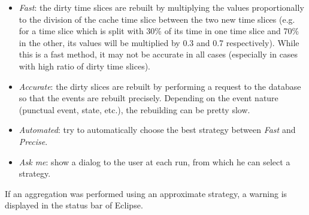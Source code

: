 \documentclass[twoside]{article}
\begin{document}
\begin{sloppypar}
\begin{itemize}
	\begin{itemize}
		\item \textit{Fast}: the dirty time slices are rebuilt by multiplying the values proportionally to the division of the cache time slice between the two new time slices (e.g. for a time slice which is split with 30\% of its time in one time slice and 70\% in the other, its values will be multiplied by 0.3 and 0.7 respectively). While this is a fast method, it may not be accurate in all cases (especially in cases with high ratio of dirty time slices).
		\item \textit{Accurate}: the dirty slices are rebuilt by performing a request to the database so that the events are rebuilt precisely. Depending on the event nature (punctual event, state, etc.), the rebuilding can be pretty slow.
		\item \textit{Automated}: try to automatically choose the best strategy between \textit{Fast} and \textit{Precise}. 
		\item \textit{Ask me}: show a dialog to the user at each run, from which he can select a strategy.
	\end{itemize}   
\end{itemize} 

If an aggregation was performed using an approximate strategy, a warning is displayed in the status bar of Eclipse.


\end{sloppypar}
\end{document}
